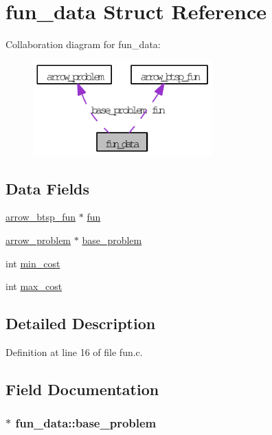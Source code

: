 \hypertarget{structfun__data}{
\section{fun\_\-data Struct Reference}
\label{structfun__data}
}
Collaboration diagram for fun\_\-data:\nopagebreak
\begin{figure}[H]
\begin{center}
\leavevmode
\includegraphics[width=196pt]{structfun__data__coll__graph}
\end{center}
\end{figure}
\subsection*{Data Fields}
\begin{CompactItemize}
\item 
\hyperlink{structarrow__btsp__fun}{arrow\_\-btsp\_\-fun} $\ast$ \hyperlink{structfun__data_a4103cadf3d844dc528d9e02884cfc98}{fun}
\item 
\hyperlink{structarrow__problem}{arrow\_\-problem} $\ast$ \hyperlink{structfun__data_8975a7eed7c3a3fa00f7a15c54e1c80b}{base\_\-problem}
\item 
int \hyperlink{structfun__data_7e1ccad6deed6f629864205a7c25794c}{min\_\-cost}
\item 
int \hyperlink{structfun__data_f149f55b8d22a020fcebd8f55325d1e5}{max\_\-cost}
\end{CompactItemize}


\subsection{Detailed Description}


Definition at line 16 of file fun.c.

\subsection{Field Documentation}
\hypertarget{structfun__data_8975a7eed7c3a3fa00f7a15c54e1c80b}{
\subsubsection[{base\_\-problem}]{$\ast$ {\bf fun\_\-data::base\_\-problem}}}
\label{structfun__data_8975a7eed7c3a3fa00f7a15c54e1c80b}


